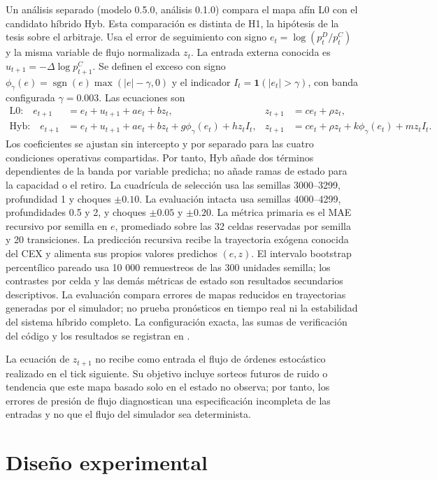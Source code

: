 Un análisis separado (modelo 0.5.0, análisis 0.1.0) compara el mapa afín L0 con el candidato híbrido Hyb. Esta comparación es distinta de H1, la hipótesis de la tesis sobre el arbitraje. Usa el error de seguimiento con signo $e_t=\log(p_t^D/p_t^C)$ y la misma variable de flujo normalizada $z_t$. La entrada externa conocida es $u_{t+1}=-\Delta\log p^C_{t+1}$. Se definen el exceso con signo $\phi_\gamma(e)=\operatorname{sgn}(e)\max(|e|-\gamma,0)$ y el indicador $I_t=\mathbf{1}(|e_t|>\gamma)$, con banda configurada $\gamma=0.003$. Las ecuaciones son
\begin{align}
  \text{L0:}\quad e_{t+1}&=e_t+u_{t+1}+a e_t+b z_t,& z_{t+1}&=c e_t+\rho z_t,\\
  \text{Hyb:}\quad e_{t+1}&=e_t+u_{t+1}+a e_t+b z_t+g\phi_\gamma(e_t)+h z_t I_t,&
  z_{t+1}&=c e_t+\rho z_t+k\phi_\gamma(e_t)+m z_t I_t.
\end{align}
Los coeficientes se ajustan sin intercepto y por separado para las cuatro condiciones operativas compartidas. Por tanto, Hyb añade dos términos dependientes de la banda por variable predicha; no añade ramas de estado para la capacidad o el retiro. La cuadrícula de selección usa las semillas 3000--3299, profundidad 1 y choques $\pm0.10$. La evaluación intacta usa semillas 4000--4299, profundidades 0.5 y 2, y choques $\pm0.05$ y $\pm0.20$. La métrica primaria es el MAE recursivo por semilla en $e$, promediado sobre las 32 celdas reservadas por semilla y 20 transiciones. La predicción recursiva recibe la trayectoria exógena conocida del CEX y alimenta sus propios valores predichos $(e,z)$. El intervalo bootstrap percentílico pareado usa 10 000 remuestreos de las 300 unidades semilla; los contrastes por celda y las demás métricas de estado son resultados secundarios descriptivos. La evaluación compara errores de mapas reducidos en trayectorias generadas por el simulador; no prueba pronósticos en tiempo real ni la estabilidad del sistema híbrido completo. La configuración exacta, las sumas de verificación del código y los resultados se registran en .

La ecuación de $z_{t+1}$ no recibe como entrada el flujo de órdenes estocástico realizado en el tick siguiente. Su objetivo incluye sorteos futuros de ruido o tendencia que este mapa basado solo en el estado no observa; por tanto, los errores de presión de flujo diagnostican una especificación incompleta de las entradas y no que el flujo del simulador sea determinista.

\section{Diseño experimental}

